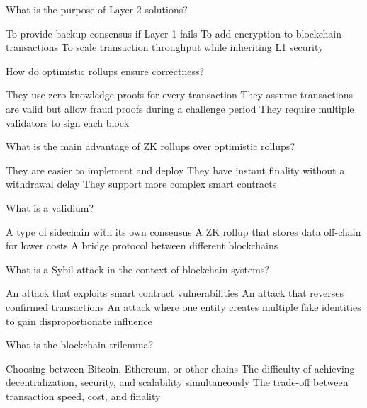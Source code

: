 \documentclass[10pt,a4paper,american]{exam}
\begin{document}
\begin{questions}
	\question What is the purpose of Layer 2 solutions?
	\begin{randomizechoices}
		\choice To provide backup consensus if Layer 1 fails
		\choice To add encryption to blockchain transactions
		\CorrectChoice To scale transaction throughput while inheriting L1 security
	\end{randomizechoices}

	\question How do optimistic rollups ensure correctness?
	\begin{randomizechoices}
		\choice They use zero-knowledge proofs for every transaction
		\CorrectChoice They assume transactions are valid but allow fraud proofs during a challenge period
		\choice They require multiple validators to sign each block
	\end{randomizechoices}

	\question What is the main advantage of ZK rollups over optimistic rollups?
	\begin{randomizechoices}
		\choice They are easier to implement and deploy
		\CorrectChoice They have instant finality without a withdrawal delay
		\choice They support more complex smart contracts
	\end{randomizechoices}

	\question What is a validium?
	\begin{randomizechoices}
		\choice A type of sidechain with its own consensus
		\CorrectChoice A ZK rollup that stores data off-chain for lower costs
		\choice A bridge protocol between different blockchains
	\end{randomizechoices}

	\question What is a Sybil attack in the context of blockchain systems?
	\begin{randomizechoices}
		\choice An attack that exploits smart contract vulnerabilities
		\choice An attack that reverses confirmed transactions
		\CorrectChoice An attack where one entity creates multiple fake identities to gain disproportionate influence
	\end{randomizechoices}

	\question What is the blockchain trilemma?
	\begin{randomizechoices}
		\choice Choosing between Bitcoin, Ethereum, or other chains
		\CorrectChoice The difficulty of achieving decentralization, security, and scalability simultaneously
		\choice The trade-off between transaction speed, cost, and finality
	\end{randomizechoices}

\end{questions}

\clearpage

\end{document}
